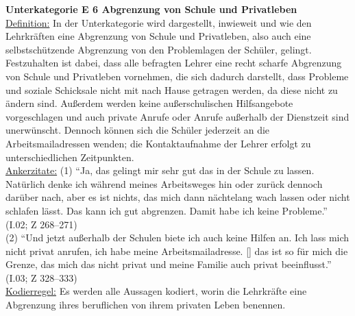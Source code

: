 \noindent
\textbf{Unterkategorie E 6 Abgrenzung von Schule und Privatleben}\\
\underline{Definition:} In der Unterkategorie wird dargestellt, inwieweit und wie den Lehrkräften eine Abgrenzung von Schule und Privatleben, also auch eine selbstschützende Abgrenzung von den Problemlagen der Schüler, gelingt. Festzuhalten ist dabei, dass alle befragten Lehrer eine recht scharfe Abgrenzung von Schule und Privatleben vornehmen, die sich dadurch darstellt, dass Probleme und soziale Schicksale nicht mit nach Hause getragen werden, da diese nicht zu ändern sind. Außerdem werden keine außerschulischen Hilfsangebote vorgeschlagen und auch private Anrufe oder Anrufe außerhalb der Dienstzeit sind unerwünscht. Dennoch können sich die Schüler jederzeit an die Arbeitsmailadressen wenden; die Kontaktaufnahme der Lehrer erfolgt zu unterschiedlichen Zeitpunkten.\\
\underline{Ankerzitate:} (1) "`Ja, das gelingt mir sehr gut das in der Schule zu lassen. Natürlich denke ich während meines Arbeitsweges hin oder zurück dennoch darüber nach, aber es ist nichts, das mich dann nächtelang wach lassen oder nicht schlafen lässt. Das kann ich gut abgrenzen. Damit habe ich keine Probleme."' (I.02; Z 268--271)\\ (2) "`Und jetzt außerhalb der Schulen biete ich auch keine Hilfen an. Ich lass mich nicht privat anrufen, ich habe meine Arbeitsmailadresse. [\punkte] das ist so für mich die Grenze, das mich das nicht privat und meine Familie auch privat beeinflusst."' (I.03; Z 328--333)\\
\underline{Kodierregel:} Es werden alle Aussagen kodiert, worin die Lehrkräfte eine Abgrenzung ihres beruflichen von ihrem privaten Leben benennen.\\


